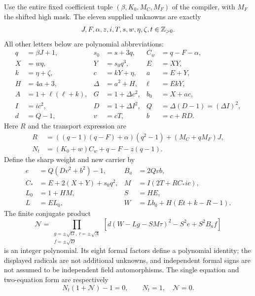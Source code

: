 Use the entire fixed coefficient tuple $(\beta,K_0,M_C,M_F)$ of the compiler,
with $M_F$ the shifted high mask. The eleven supplied unknowns are exactly
\[
 J,F,\alpha,z,i,T,s,w,\eta,\zeta,t\in\mathbb Z_{>0}.
\]
All other letters below are polynomial abbreviations:
\begin{align*}
 q&=\beta J+1,&s_0&=s+3q,&C_w&=q-F-\alpha,\\
 X&=wq,&Y&=s_0q^3,&E&=XY,\\
 k&=\eta+\zeta,&c&=kY+\eta,&a&=E+Y,\\
 H&=4a+3,&\Delta&=a^2+H,&\ell&=EkY,\\
 A&=1+\ell(\ell+k),&G&=1+\Delta c^2,&b_0&=X+ac,\\
 I&=ic^2,&D&=1+\Delta I^2,&Q&=\Delta(D-1)=(\Delta I)^2,\\
 d&=Q-1,&v&=cT,&b&=c+RD.
\end{align*}
Here $R$ and the transport expression are
\begin{align*}
 R&=((q-1)(q-F)+\alpha)(q^2-1)+(M_C+qM_F)J,\\
 N_t&=(K_0+w)C_w+q-F-z(q-1).
\end{align*}
Define the sharp weight and new carrier by
\begin{align*}
 e&=Q(Dv^2+b^2)-1,&B_a&=2Qvb,\\
 C_*&=E+2(X+Y)+s_0q^2,&M&=I(2T+RC_*ic),\\
 L_0&=1+HM,&S&=HE,\\
 L&=EL_0,&W&=Lb_0+H(Et+k-R-1).
\end{align*}
The finite conjugate product
\begin{equation}
 \mathcal N=
 \prod_{\substack{g=\pm\sqrt G,\ \tau=\pm\sqrt A\\f=\pm\sqrt D}}
 \left[d(W-Lg-SM\tau)^2-S^2e+S^2B_af\right]
 \label{eq:eleven-norm}
\end{equation}
is an integer polynomial. Its eight formal factors define a polynomial
identity; the displayed radicals are not additional unknowns, and independent
formal signs are not assumed to be independent field automorphisms.
The single equation and two-equation form are respectively
\begin{equation}
 \boxed{N_t(1+\mathcal N)-1=0},
 \qquad
 \boxed{N_t=1,\quad\mathcal N=0}.
 \label{eq:eleven-final}
\end{equation}

